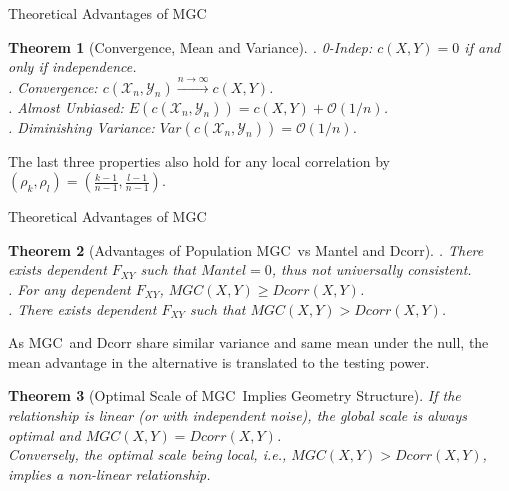 \documentclass[mathserif,t]{beamer}
\newtheorem{thm}{Theorem}
\newcommand{\Mgc}{MGC}
\begin{document}
\begin{frame}{Theoretical Advantages of \Mgc}
\begin{thm}[Convergence, Mean and Variance]
. 0-Indep: $c(X,Y) =0$ if and only if independence.\\
\pause
{}. Convergence: $c(\mathcal{X}_{n},\mathcal{Y}_{n}) \stackrel{n \rightarrow \infty}{\rightarrow} c(X,Y)$.\\
\pause
{}. Almost Unbiased: $E(c(\mathcal{X}_{n},\mathcal{Y}_{n})) =c(X,Y)+\mathcal{O}(1/n)$.\\
\pause
{}. Diminishing Variance: $Var(c(\mathcal{X}_{n},\mathcal{Y}_{n})) =\mathcal{O}(1/n)$.\\
\end{thm}
\pause
\medskip
The last three properties also hold for any local correlation by $(\rho_{k},\rho_{l})=(\frac{k-1}{n-1},\frac{l-1}{n-1})$.
\end{frame}

\begin{frame}{Theoretical Advantages of \Mgc}
\begin{thm}[Advantages of Population \Mgc~vs Mantel and Dcorr]
. There exists dependent $F_{XY}$ such that $Mantel=0$, thus not universally consistent.\\
\pause
{}. For any dependent $F_{XY}$, $MGC(X,Y) \geq Dcorr(X,Y)$. \\
\pause
{}. There exists dependent $F_{XY}$ such that $MGC(X,Y)>Dcorr(X,Y)$.\\
\end{thm}
\pause
As \Mgc~and Dcorr share similar variance and same mean under the null, the mean advantage in the alternative is translated to the testing power. 
\pause
\begin{thm}[Optimal Scale of \Mgc~Implies Geometry Structure]
\pause
If the relationship is linear (or with independent noise), the global scale is always optimal and $MGC(X,Y)=Dcorr(X,Y)$.\\
\pause
\medskip
Conversely, the optimal scale being local, i.e., $MGC(X,Y)>Dcorr(X,Y)$, implies a non-linear relationship.
\end{thm}
\end{frame}
\end{document}
